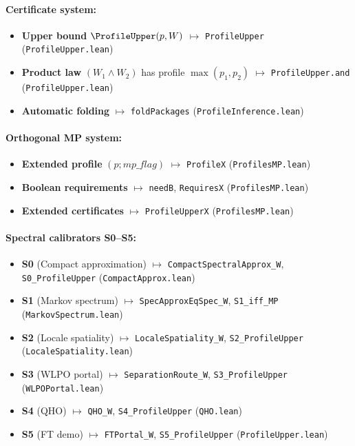 \documentclass[11pt]{article}
\newcommand{\lean}[1]{\texttt{#1}}
\theoremstyle{plain}
\theoremstyle{definition}
\theoremstyle{remark}
\begin{document}
\paragraph{Certificate system:}
\begin{itemize}
\item \textbf{Upper bound} $\ProfileUpper(p,W)$ $\mapsto$ \lean{ProfileUpper} (\texttt{ProfileUpper.lean})
\item \textbf{Product law} $(W_1 \land W_2)$ has profile $\max(p_1,p_2)$ $\mapsto$ \lean{ProfileUpper.and} (\texttt{ProfileUpper.lean})
\item \textbf{Automatic folding} $\mapsto$ \lean{foldPackages} (\texttt{ProfileInference.lean})
\end{itemize}

\paragraph{Orthogonal MP system:}
\begin{itemize}
\item \textbf{Extended profile} $(p; \mathit{mp\_flag})$ $\mapsto$ \lean{ProfileX} (\texttt{ProfilesMP.lean})
\item \textbf{Boolean requirements} $\mapsto$ \lean{needB}, \lean{RequiresX} (\texttt{ProfilesMP.lean})
\item \textbf{Extended certificates} $\mapsto$ \lean{ProfileUpperX} (\texttt{ProfilesMP.lean})
\end{itemize}

\paragraph{Spectral calibrators S0--S5:}
\begin{itemize}
\item \textbf{S0} (Compact approximation) $\mapsto$ \lean{CompactSpectralApprox\_W}, \lean{S0\_ProfileUpper} (\texttt{CompactApprox.lean})
\item \textbf{S1} (Markov spectrum) $\mapsto$ \lean{SpecApproxEqSpec\_W}, \lean{S1\_iff\_MP} (\texttt{MarkovSpectrum.lean})
\item \textbf{S2} (Locale spatiality) $\mapsto$ \lean{LocaleSpatiality\_W}, \lean{S2\_ProfileUpper} (\texttt{LocaleSpatiality.lean})
\item \textbf{S3} (WLPO portal) $\mapsto$ \lean{SeparationRoute\_W}, \lean{S3\_ProfileUpper} (\texttt{WLPOPortal.lean})
\item \textbf{S4} (QHO) $\mapsto$ \lean{QHO\_W}, \lean{S4\_ProfileUpper} (\texttt{QHO.lean})
\item \textbf{S5} (FT demo) $\mapsto$ \lean{FTPortal\_W}, \lean{S5\_ProfileUpper} (\texttt{ProfileUpper.lean})
\end{itemize}
\end{document}
